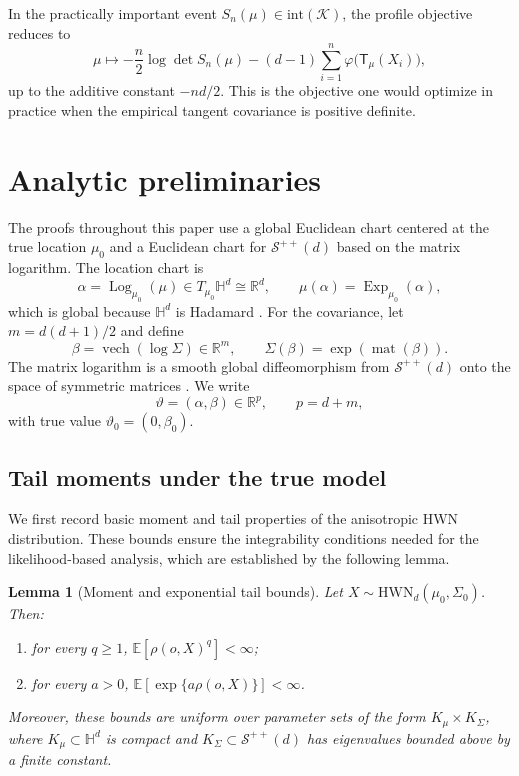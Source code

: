 \documentclass[11pt]{article}
\newtheorem{lemma}[theorem]{Lemma}
\DeclareMathOperator{\vech}{vech}
\DeclareMathOperator{\mat}{mat}
\newcommand{\R}{\mathbb{R}}
\newcommand{\E}{\mathbb{E}}
\newcommand{\Hh}{\mathbb{H}}
\newcommand{\SPD}{\mathcal{S}^{++}}
\newcommand{\Exp}{\operatorname{Exp}}
\newcommand{\Log}{\operatorname{Log}}
\newcommand{\shell}{\mathcal{K}}
\newcommand{\psiwrap}{\varphi}
\newcommand{\T}{\mathsf{T}}
\begin{document}
In the practically important event $S_n(\mu)\in \mathrm{int}(\shell)$, the profile objective reduces to
\begin{equation}
\label{eq:practical-profile-criterion}
\mu\mapsto
-\frac n2\log\det S_n(\mu)
-(d-1)\sum_{i=1}^n \psiwrap\bigl(\T_\mu(X_i)\bigr),
\end{equation}
up to the additive constant $-nd/2$. This is the objective one would optimize in practice when the empirical tangent covariance is positive definite.






\section{Analytic preliminaries}
\label{sec:prelim}

The proofs throughout this paper use a global Euclidean chart centered at the true location $\mu_0$ and a Euclidean chart for $\SPD(d)$ based on the matrix logarithm. The location chart is
\begin{equation}
\label{eq:alpha-chart}
\alpha=\Log_{\mu_0}(\mu)\in T_{\mu_0}\Hh^d\cong \R^d,
\qquad
\mu(\alpha)=\Exp_{\mu_0}(\alpha),
\end{equation}
which is global because $\Hh^d$ is Hadamard \citep{lee_1997_RiemannianManifoldsIntroduction}. For the covariance, let $m=d(d+1)/2$ and define
\begin{equation}
\label{eq:beta-chart}
\beta=\vech(\log\Sigma)\in\R^m,
\qquad
\Sigma(\beta)=\exp(\mat(\beta)).
\end{equation}
The matrix logarithm is a smooth global diffeomorphism from $\SPD(d)$ onto the space of symmetric matrices \citep{bhatia_2009_PositiveDefiniteMatrices}. We write
\[
\vartheta=(\alpha,\beta)\in\R^p,
\qquad
p=d+m,
\]
with true value $\vartheta_0=(0,\beta_0)$.

\subsection{Tail moments under the true model}

We first record basic moment and tail properties of the anisotropic HWN distribution. These bounds ensure the integrability conditions needed for the likelihood-based analysis, which are established by the following lemma.

\begin{lemma}[Moment and exponential tail bounds]\label{lem:moments}
Let $X\sim \mathrm{HWN}_d(\mu_0,\Sigma_0)$. Then:
\begin{enumerate}[label=(\alph*)]
\item for every $q\ge 1$, $\E[\rho(o,X)^q]<\infty$;
\item for every $a>0$, $\E[\exp\{a\rho(o,X)\}]<\infty$.
\end{enumerate}
Moreover, these bounds are uniform over parameter sets of the form $K_\mu\times K_\Sigma$, where $K_\mu\subset\Hh^d$ is compact and $K_\Sigma\subset\SPD(d)$ has eigenvalues bounded above by a finite constant.
\end{lemma}
\end{document}
